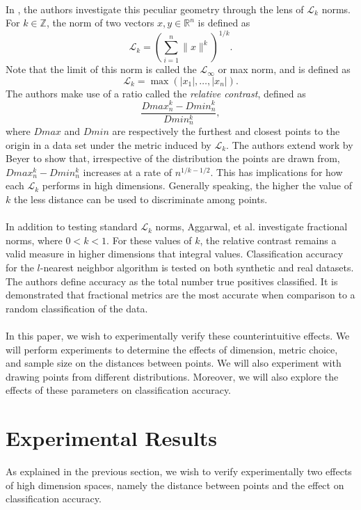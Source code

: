 \documentclass{article}
\newcommand{\Z}{\mathbb{Z}}
\newcommand{\R}{\mathbb{R}}
\begin{document}
\paragraph{}
In \cite{aggarwal2001surprising}, the authors investigate this peculiar geometry through the lens of $\mathcal{L}_k$ norms. For $k\in\Z$, the norm of two vectors $x,y\in\R^n$ is defined as
$$
\mathcal{L}_k=\left(\sum_{i=1}^n\|x\|^k\right)^{1/k}.
$$
Note that the limit of this norm is called the $\mathcal{L}_{\infty}$ or max norm, and is defined as
$$
\mathcal{L}_k=\max(|x_1|,\ldots,|x_n|).
$$
The authors make use of a ratio called the \emph{relative contrast}, defined as
$$
\dfrac{Dmax_n^k-Dmin_n^k}{Dmin_n^k},
$$
where $Dmax$ and $Dmin$ are respectively the furthest and closest points to the origin in a data set under the metric induced by $\mathcal{L}_k$. The authors extend work by Beyer\cite{beyer1999nearest} to show that, irrespective of the distribution the points are drawn from, $Dmax_n^k-Dmin_n^k$ increases at a rate of $n^{1/k-1/2}$. This has implications for how each  $\mathcal{L}_k$ performs in high dimensions. Generally speaking, the higher the value of $k$ the less distance can be used to discriminate among points.
\paragraph{}
In addition to testing standard $\mathcal{L}_k$ norms,  Aggarwal, et al. investigate fractional norms, where $0< k < 1$. For these values of $k$, the relative contrast remains a valid measure in higher dimensions that integral values. Classification accuracy for the $l$-nearest neighbor algorithm is tested on both synthetic and real datasets. The authors define accuracy as the total number true positives classified. It is demonstrated that fractional metrics are the most accurate when comparison to a random classification of the data.
\paragraph{}
In this paper, we wish to experimentally verify these counterintuitive effects. We will perform experiments to determine the effects of dimension, metric choice, and sample size on the distances between points. We will also experiment with drawing points from different distributions. Moreover, we will also explore the effects of these parameters on classification accuracy. 
\section{Experimental Results}
As explained in the previous section, we wish to verify experimentally two effects of high dimension spaces, namely the distance between points and the effect on classification accuracy. 
\end{document}
